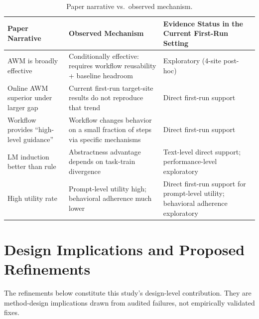 \documentclass{article}
\begin{document}
{\begin{longtable}[]{@{}
  >{\raggedright\arraybackslash}p{}
  >{\raggedright\arraybackslash}p{}
  >{\raggedright\arraybackslash}p{}@{}}
\caption{Paper narrative vs.~observed mechanism.}\label{tab:paper-narrative-vs-observed-mechanism}\\

\toprule\noalign{}
\begin{minipage}[b]{\linewidth}\raggedright
Paper Narrative
\end{minipage} & \begin{minipage}[b]{\linewidth}\raggedright
Observed Mechanism
\end{minipage} & \begin{minipage}[b]{\linewidth}\raggedright
Evidence Status in the Current First-Run Setting
\end{minipage} \\
\midrule\noalign{}
\endhead
\bottomrule\noalign{}
\endlastfoot
AWM is broadly effective & Conditionally effective: requires workflow
reusability + baseline headroom & Exploratory (4-site post-hoc) \\
Online AWM superior under larger gap & Current first-run target-site
results do not reproduce that trend & Direct first-run support \\
Workflow provides ``high-level guidance'' & Workflow changes behavior on
a small fraction of steps via specific mechanisms & Direct first-run
support \\
LM induction better than rule & Abstractness advantage depends on
task-train divergence & Text-level direct support; performance-level
exploratory \\
High utility rate & Prompt-level utility high; behavioral adherence much
lower & Direct first-run support for prompt-level utility; behavioral
adherence exploratory \\
\end{longtable}
}

\section{Design Implications and Proposed
Refinements}\label{design-implications-and-proposed-refinements}

The refinements below constitute this study's design-level
contribution. They are method-design implications drawn from audited
failures, not empirically validated fixes.
\end{document}
